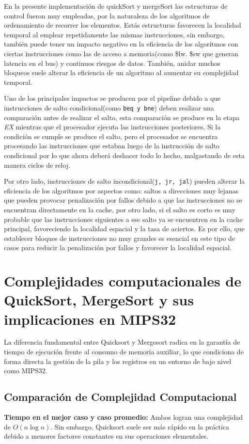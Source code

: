 \documentclass[12pt, a4paper]{article}
\begin{document}
        En la presente implementación de quickSort y mergeSort las estructuras de control fueron muy empleadas, por la naturaleza de los algoritmos de ordenamiento de recorrer los elementos. Estás estructuras favorecen la localidad temporal al emplear repetidamente las mismas instrucciones, sin embargo, también puede tener un impacto negativo en la eficiencia de los algoritmos con ciertas instrucciones como las de acceso a memoria(como \$lw. \$sw que generan latencia en el bus) y continuos riesgos de datos. También, anidar muchos bloqueos suele alterar la eficiencia de un algoritmo al aumentar su complejidad temporal.
        
        Uno de los principales impactos se producen por el pipeline debido a que instrucciones de salto condicional(como \lstinline|beq y bne|) deben realizar una comparación antes de realizar el salto, esta comparación se produce en la etapa \textit{EX} mientras que el procesador ejecuta las instrucciones posteriores. Si la condición se cumple se produce el salto, pero el procesador se encuentra procesando las instrucciones que estaban luego de la instrucción de salto condicional por lo que ahora deberá deshacer todo lo hecho, malgastando de esta manera ciclos de reloj.

        Por otro lado, instrucciones de salto incondicional(\lstinline|j, jr, jal|) pueden alterar la eficiencia de los algoritmos por aspectos como: saltos a direcciones muy lejanas que pueden provocar penalización por fallos debido a que las instrucciones no se encuentran directamente en la cache, por otro lado, si el salto es corto es muy probable que las instrucciones siguientes a ese salto ya se encuentren en la cache principal, favoreciendo la localidad espacial y la tasa de aciertos. Es por ello, que establecer bloques de instrucciones no muy grandes es esencial en este tipo de casos para reducir la penalización por fallos y favorecer la localidad espacial.
    \section{Complejidades computacionales de QuickSort, MergeSort y sus implicaciones en MIPS32}
        La diferencia fundamental entre Quicksort y Mergesort radica en la garantía de tiempo de ejecución frente al consumo de memoria auxiliar, lo que condiciona de forma directa la gestión de la pila y los registros en un entorno de bajo nivel como MIPS32.
        \subsection{Comparación de Complejidad Computacional}
            \textbf{Tiempo en el mejor caso y caso promedio:} Ambos logran una complejidad de $O(n \log n)$. Sin embargo, Quicksort suele ser más rápido en la práctica debido a menores factores constantes en sus operaciones elementales.
            
\end{document}
